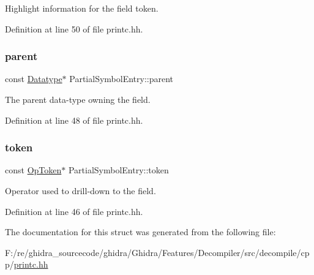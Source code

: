 Highlight information for the field token. 



Definition at line 50 of file printc.\+hh.

\mbox{\label{struct_partial_symbol_entry_a71ae1afca5857bc5e1834a1393683bdd}} 
\subsubsection{\texorpdfstring{parent}{parent}}
{\footnotesize\ttfamily const \mbox{\hyperlink{class_datatype}{Datatype}}$\ast$ Partial\+Symbol\+Entry\+::parent}



The parent data-\/type owning the field. 



Definition at line 48 of file printc.\+hh.

\mbox{\label{struct_partial_symbol_entry_ab6fd2eded59cdec7422bbf6c49e46f63}} 
\subsubsection{\texorpdfstring{token}{token}}
{\footnotesize\ttfamily const \mbox{\hyperlink{class_op_token}{Op\+Token}}$\ast$ Partial\+Symbol\+Entry\+::token}



Operator used to drill-\/down to the field. 



Definition at line 46 of file printc.\+hh.



The documentation for this struct was generated from the following file\+:\begin{DoxyCompactItemize}
\item 
F\+:/re/ghidra\+\_\+sourcecode/ghidra/\+Ghidra/\+Features/\+Decompiler/src/decompile/cpp/\mbox{\hyperlink{printc_8hh}{printc.\+hh}}\end{DoxyCompactItemize}
